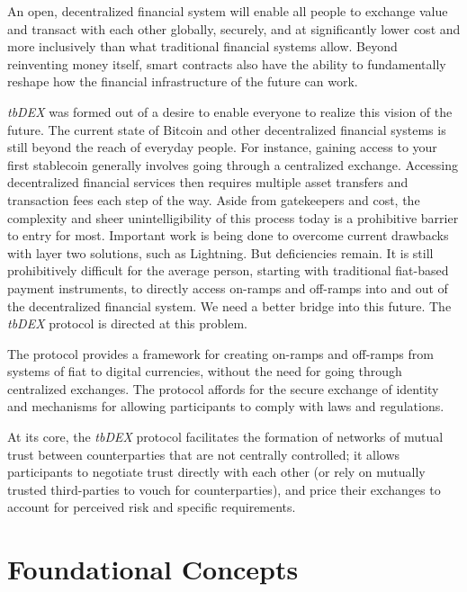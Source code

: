 \documentclass[11pt]{article}
\begin{document}
\vspace{1\baselineskip}
An open, decentralized financial system will enable all people to exchange value and transact with each other globally, securely, and at significantly lower cost and more inclusively than what traditional financial systems allow.  Beyond reinventing money itself, smart contracts also have the ability to fundamentally reshape how the financial infrastructure of the future can work.

\vspace{1\baselineskip}
\textit{tbDEX }was formed out of a desire to enable everyone to realize this vision of the future.  The current state of Bitcoin and other decentralized financial systems is still beyond the reach of everyday people. For instance, gaining access to your first stablecoin generally involves going through a centralized exchange. Accessing decentralized financial services then requires multiple asset transfers and transaction fees each step of the way. Aside from gatekeepers and cost, the complexity and sheer unintelligibility of this process today is a prohibitive barrier to entry for most. Important work is being done to overcome current drawbacks with layer two solutions, such as Lightning. But deficiencies remain. It is still prohibitively difficult for the average person, starting with traditional fiat-based payment instruments, to directly access on-ramps and off-ramps into and out of the decentralized financial system. We need a better bridge into this future. The \textit{tbDEX} protocol is directed at this problem.

\vspace{1\baselineskip}
The protocol provides a framework for creating on-ramps and off-ramps from systems of fiat to digital currencies, without the need for going through centralized exchanges. The protocol affords for the secure exchange of identity and mechanisms for allowing participants to comply with laws and regulations. 

\vspace{1\baselineskip}
At its core, the \textit{tbDEX} protocol facilitates the formation of networks of mutual trust between counterparties that are not centrally controlled; it allows participants to negotiate trust directly with each other (or rely on mutually trusted third-parties to vouch for counterparties), and price their exchanges to account for perceived risk and specific requirements. 

\vspace{1\baselineskip}
\section{Foundational Concepts}
\end{document}
